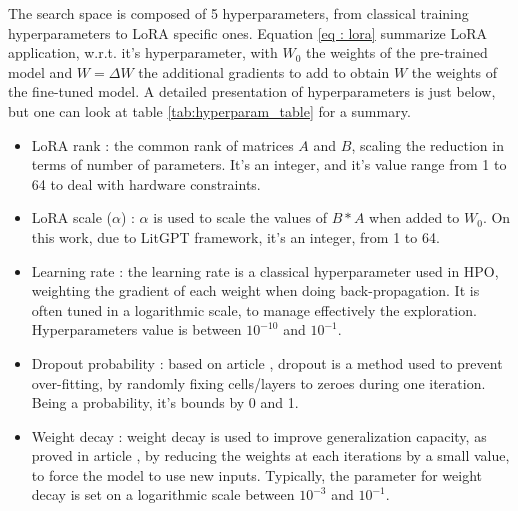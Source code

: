 \documentclass[runningheads]{llncs}
\begin{document}
The search space is composed of 5 hyperparameters, from classical training hyperparameters to LoRA specific ones. Equation \ref{eq : lora} summarize LoRA application, w.r.t. it's hyperparameter, with $W_0$ the weights of the pre-trained model and $W=\Delta W$ the additional gradients to add to obtain $W$ the weights of the fine-tuned model. A detailed presentation of hyperparameters is just below, but one can look at table \ref{tab:hyperparam_table} for a summary.
\begin{itemize}
    \item LoRA rank : the common rank of matrices $A$ and $B$, scaling the reduction in terms of number of parameters. It's an integer, and it's value range from 1 to 64 to deal with hardware constraints.
    \item LoRA scale ($\alpha$) : $\alpha$ is used to scale the values of $B*A$ when added to $W_0$. On this work, due to LitGPT framework, it's an integer, from 1 to 64.
    \item Learning rate : the learning rate is a classical hyperparameter used in HPO, weighting the gradient of each weight when doing back-propagation. It is often tuned in a logarithmic scale, to manage effectively the exploration. Hyperparameters value is between $10^{-10}$ and $10^{-1}$.
    \item Dropout probability : based on article \cite{srivastava_dropout_2014}, dropout is a method used to prevent over-fitting, by randomly fixing cells/layers to zeroes during one iteration. Being a probability, it's bounds by 0 and 1.
    \item Weight decay : weight decay is used to improve generalization capacity, as proved in article \cite{krogh_simple_1991}, by reducing the weights at each iterations by a small value, to force the model to use new inputs. Typically, the parameter for weight decay is set on a logarithmic scale between $10^{-3}$ and $10^{-1}$.
\end{itemize}
\end{document}
